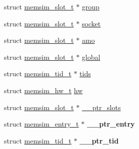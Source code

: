 \begin{DoxyCompactItemize}
struct \hyperlink{structmemsim__slot__t}{memsim\-\_\-slot\-\_\-t} $\ast$ \hyperlink{structmemsim__t_a0569d3661744c965a6620ca75563144d}{group}
\item 
struct \hyperlink{structmemsim__slot__t}{memsim\-\_\-slot\-\_\-t} $\ast$ \hyperlink{structmemsim__t_a42ae6dd8a64e2d04c30e35354ec25555}{socket}
\item 
struct \hyperlink{structmemsim__slot__t}{memsim\-\_\-slot\-\_\-t} $\ast$ \hyperlink{structmemsim__t_a9e7a2ce164d954f25105d93eaf040b3f}{amo}
\item 
struct \hyperlink{structmemsim__slot__t}{memsim\-\_\-slot\-\_\-t} $\ast$ \hyperlink{structmemsim__t_a3b005d5aa8e759a08281f59c9f05ed3b}{global}
\item 
struct \hyperlink{structmemsim__tid__t}{memsim\-\_\-tid\-\_\-t} $\ast$ \hyperlink{structmemsim__t_acbb8fb6d4f5d4b4a918cb611fb113327}{tids}
\item 
struct \hyperlink{structmemsim__hw__t}{memsim\-\_\-hw\-\_\-t} \hyperlink{structmemsim__t_af5113def268ae634e203d4a6639a37f3}{hw}
\item 
struct \hyperlink{structmemsim__slot__t}{memsim\-\_\-slot\-\_\-t} $\ast$ \hyperlink{structmemsim__t_a13bfc8f8ea24eb83b5b3976aee534db3}{\-\_\-\-\_\-ptr\-\_\-slots}
\item 
\hypertarget{structmemsim__t_ac8e490728a0881577947adb893811324}{struct \hyperlink{structmemsim__entry__t}{memsim\-\_\-entry\-\_\-t} $\ast$ {\bfseries \-\_\-\-\_\-ptr\-\_\-entry}}\label{structmemsim__t_ac8e490728a0881577947adb893811324}

\item 
\hypertarget{structmemsim__t_a48f923436d3f440da8a2c529f507bb4a}{struct \hyperlink{structmemsim__tid__t}{memsim\-\_\-tid\-\_\-t} $\ast$ {\bfseries \-\_\-\-\_\-ptr\-\_\-tid}}\label{structmemsim__t_a48f923436d3f440da8a2c529f507bb4a}

\end{DoxyCompactItemize}


